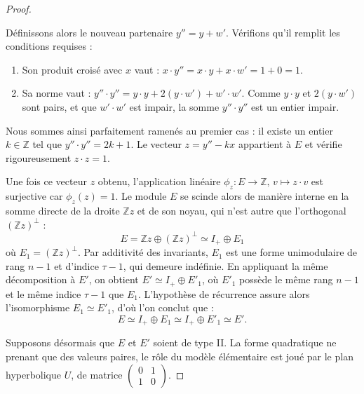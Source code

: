 \begin{proof}
\begin{itemize}
    Définissons alors le nouveau partenaire $y'' = y + w'$. Vérifions qu'il remplit les conditions requises :
    \begin{enumerate}
        \item Son produit croisé avec $x$ vaut : $x \cdot y'' = x \cdot y + x \cdot w' = 1 + 0 = 1$.
        \item Sa norme vaut : $y'' \cdot y'' = y \cdot y + 2(y \cdot w') + w' \cdot w'$. Comme $y \cdot y$ et $2(y \cdot w')$ sont pairs, et que $w' \cdot w'$ est impair, la somme $y'' \cdot y''$ est un entier impair.
    \end{enumerate}
    Nous sommes ainsi parfaitement ramenés au premier cas : il existe un entier $k \in \mathbb{Z}$ tel que $y'' \cdot y'' = 2k + 1$. Le vecteur $z = y'' - kx$ appartient à $E$ et vérifie rigoureusement $z \cdot z = 1$.
\end{itemize}

Une fois ce vecteur $z$ obtenu, l'application linéaire $\phi_z : E \to \mathbb{Z}, \, v \mapsto z \cdot v$ est surjective car $\phi_z(z) = 1$. Le module $E$ se scinde alors de manière interne en la somme directe de la droite $\mathbb{Z}z$ et de son noyau, qui n'est autre que l'orthogonal $(\mathbb{Z}z)^\perp$ :
\[
E = \mathbb{Z}z \oplus (\mathbb{Z}z)^\perp \simeq I_+ \oplus E_1
\]
où $E_1 = (\mathbb{Z}z)^\perp$. Par additivité des invariants, $E_1$ est une forme unimodulaire de rang $n-1$ et d'indice $\tau - 1$, qui demeure indéfinie. En appliquant la même décomposition à $E'$, on obtient $E' \simeq I_+ \oplus E'_1$, où $E'_1$ possède le même rang $n-1$ et le même indice $\tau - 1$ que $E_1$. L'hypothèse de récurrence assure alors l'isomorphisme $E_1 \simeq E'_1$, d'où l'on conclut que :
\[
E \simeq I_+ \oplus E_1 \simeq I_+ \oplus E'_1 \simeq E'.
\]

Supposons désormais que $E$ et $E'$ soient de type II. La forme quadratique ne prenant que des valeurs paires, le rôle du modèle élémentaire est joué par le plan hyperbolique $U$, de matrice $\begin{pmatrix} 0 & 1 \\ 1 & 0 \end{pmatrix}$. 


\end{proof}
